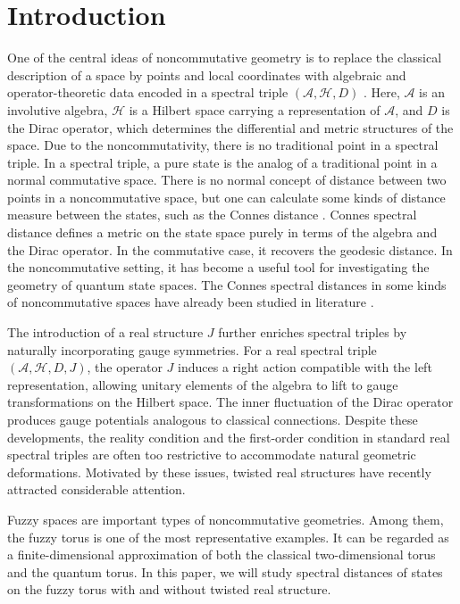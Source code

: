 \documentclass[a4paper,11pt]{article}
\begin{document}
\section{Introduction}
One of the central ideas of noncommutative geometry is to replace the classical description of a space by points and local coordinates with algebraic and operator-theoretic data encoded in a spectral triple $(\mathcal{A},\mathcal{H},D)$ \cite{Connes}. Here, $\mathcal{A}$ is an involutive algebra, $\mathcal{H}$ is a Hilbert space carrying a representation of $\mathcal{A}$, and $D$ is the Dirac operator, which determines the differential and metric structures of the space. Due to the noncommutativity, there is no traditional point in a spectral triple.
In a spectral triple, a pure state is the
analog of a traditional point in a normal commutative space.
There is no normal concept of distance between two points in a noncommutative space, but
one can calculate some kinds of distance measure between the states, such as the
Connes distance \cite{Connes1}.
Connes spectral distance
defines a metric on the state space purely in terms of the algebra and the Dirac operator. In the commutative case, it recovers the geodesic distance. In the noncommutative setting, it has become a useful tool for investigating the geometry of quantum state spaces.
The Connes spectral distances in some kinds
of noncommutative spaces have already been studied in literature
\cite{Bimonte,Cagnache,Wallet,Martinetti,DAndrea,Pythagoras,Franco,Chaoba,Revisiting,Kumar,Chakraborty,Lin1,Lin2,Clare,Kumar1}.



The introduction of a real structure $J$ further enriches spectral triples by naturally incorporating gauge symmetries\cite{Connes2,cacic,Chakraborty1}. For a real spectral triple $(\mathcal{A},\mathcal{H},D,J)$, the operator $J$ induces a right action compatible with the left representation, allowing unitary elements of the algebra to lift to gauge transformations on the Hilbert space. The inner fluctuation of the Dirac operator
produces gauge potentials analogous to classical connections.
Despite these developments, the reality condition and the first-order condition in standard real spectral triples are often too restrictive to accommodate natural geometric deformations. Motivated by these issues, twisted real structures have recently attracted considerable attention\cite{Filaci,Brzezinski1,Magee,Dabrowski,Martinetti2,Dabrowski1,Magee1}.

Fuzzy spaces are important types of noncommutative geometries\cite{Madore,Barrett1,Kimura}. Among them, the fuzzy torus is one of the most representative examples\cite{Bigatti,Bigatti1,Latremoliere,Perez}. It can be regarded as a finite-dimensional approximation of both the classical two-dimensional torus and the quantum torus.
In this paper, we will study spectral distances of states on the fuzzy torus with and without twisted real structure.
\end{document}
